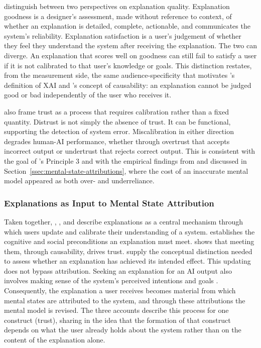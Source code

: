 \textcite{Hoffman2023} distinguish between two perspectives on explanation quality. Explanation goodness is a designer's assessment, made without reference to context, of whether an explanation is detailed, complete, actionable, and communicates the system's reliability. Explanation satisfaction is a user's judgement of whether they feel they understand the system after receiving the explanation. The two can diverge. An explanation that scores well on goodness can still fail to satisfy a user if it is not calibrated to that user's knowledge or goals. This distinction restates, from the measurement side, the same audience-specificity that motivates \textcite{Arrieta2020}'s definition of \ac{XAI} and \textcite{Shin2021}'s concept of causability: an explanation cannot be judged good or bad independently of the user who receives it.

\textcite{Hoffman2023} also frame trust as a process that requires calibration rather than a fixed quantity. Distrust is not simply the absence of trust. It can be functional, supporting the detection of system error. Miscalibration in either direction degrades human-\ac{AI} performance, whether through overtrust that accepts incorrect output or undertrust that rejects correct output. This is consistent with the goal of \textcite{Weisz2025}'s Principle 3 and with the empirical findings from \textcite{Jussupow2021} and \textcite{Colombatto2025} discussed in Section~\ref{ssec:mental-state-attributions}, where the cost of an inaccurate mental model appeared as both over- and underreliance.

\subsubsection*{Explanations as Input to Mental State Attribution}

Taken together, \textcite{Miller2019}, \textcite{Shin2021}, and \textcite{Hoffman2023} describe explanations as a central mechanism through which users update and calibrate their understanding of a system. \textcite{Miller2019} establishes the cognitive and social preconditions an explanation must meet. \textcite{Shin2021} shows that meeting them, through causability, drives trust. \textcite{Hoffman2023} supply the conceptual distinction needed to assess whether an explanation has achieved its intended effect. This updating does not bypass attribution. Seeking an explanation for an \ac{AI} output also involves making sense of the system's perceived intentions and goals \parencite{Miller2019}. Consequently, the explanation a user receives becomes material from which mental states are attributed to the system, and through these attributions the mental model is revised. The three accounts describe this process for one construct (trust), sharing in the idea that the formation of that construct depends on what the user already holds about the system rather than on the content of the explanation alone.

